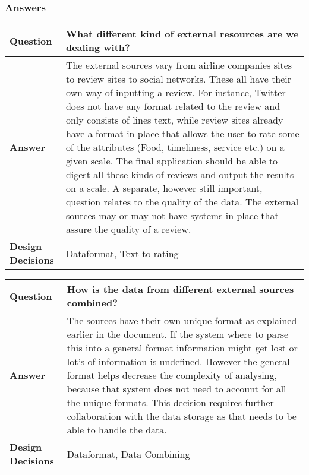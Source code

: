 \subsubsection{Answers}
\begin{longtable}{| l |  p{12cm} |}
\hline
\textbf{Question} & \textbf{What different kind of external resources are we dealing with?} \\ \hline
\textbf{Answer} &
	The external sources vary from airline companies sites to review sites to social networks. These all have their own way of inputting a review. For instance, Twitter does not have any format related to the review and only consists of lines text, while review sites already have a format in place that allows the user to rate some of the attributes (Food, timeliness, service etc.) on a given scale. The final application should be able to digest all these kinds of reviews and output the results on a scale.
A separate, however still important, question relates to the quality of the data. The external sources may or may not have systems in place that assure the quality of a review.
 \\ \hline
\textbf{Design Decisions} & Dataformat, Text-to-rating \\ \hline
\end{longtable}

\begin{longtable}{| l |  p{12cm} |}
\hline
\textbf{Question} & \textbf{How is the data from different external sources combined?} \\ \hline
\textbf{Answer} &
	The sources have their own unique format as explained earlier in the document. If the system where to parse this into a general format information might get lost or lot's of information is undefined.
However the general format helps decrease the complexity of analysing, because that system does not need to account for all the unique formats. This decision requires further collaboration with the data storage as that needs to be able to handle the data.
 \\ \hline
\textbf{Design Decisions} & Dataformat, Data Combining \\ \hline
\end{longtable}


